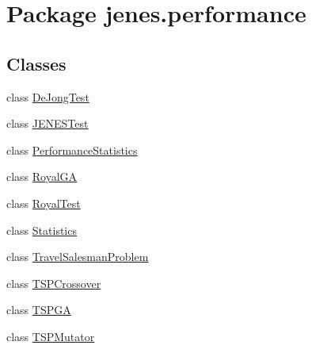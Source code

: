 \hypertarget{namespacejenes_1_1performance}{\section{Package jenes.\-performance}
\label{namespacejenes_1_1performance}
}
\subsection*{Classes}
\begin{DoxyCompactItemize}
\item 
class \hyperlink{classjenes_1_1performance_1_1_de_jong_test}{De\-Jong\-Test}
\item 
class \hyperlink{classjenes_1_1performance_1_1_j_e_n_e_s_test}{J\-E\-N\-E\-S\-Test}
\item 
class \hyperlink{classjenes_1_1performance_1_1_performance_statistics}{Performance\-Statistics}
\item 
class \hyperlink{classjenes_1_1performance_1_1_royal_g_a}{Royal\-G\-A}
\item 
class \hyperlink{classjenes_1_1performance_1_1_royal_test}{Royal\-Test}
\item 
class \hyperlink{classjenes_1_1performance_1_1_statistics}{Statistics}
\item 
class \hyperlink{classjenes_1_1performance_1_1_travel_salesman_problem}{Travel\-Salesman\-Problem}
\item 
class \hyperlink{classjenes_1_1performance_1_1_t_s_p_crossover}{T\-S\-P\-Crossover}
\item 
class \hyperlink{classjenes_1_1performance_1_1_t_s_p_g_a}{T\-S\-P\-G\-A}
\item 
class \hyperlink{classjenes_1_1performance_1_1_t_s_p_mutator}{T\-S\-P\-Mutator}
\end{DoxyCompactItemize}
